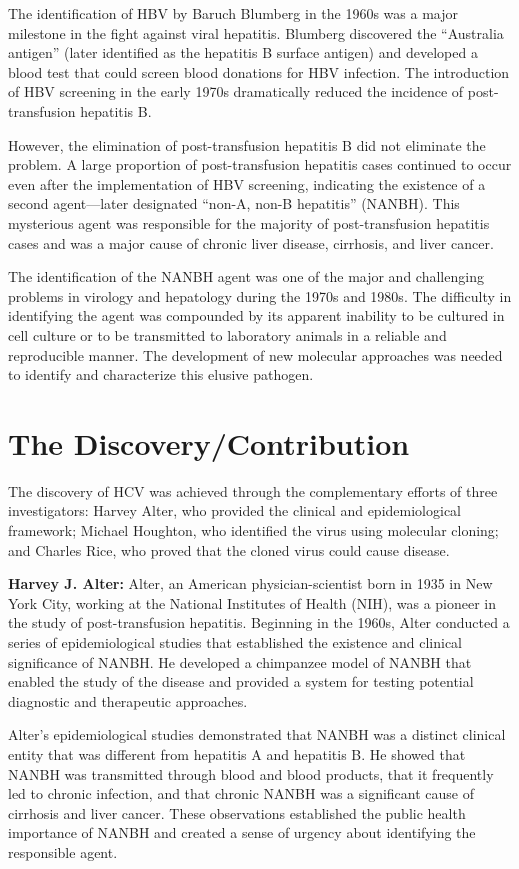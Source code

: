 The identification of HBV by Baruch Blumberg in the 1960s was a major milestone in the fight against viral hepatitis. Blumberg discovered the ``Australia antigen'' (later identified as the hepatitis B surface antigen) and developed a blood test that could screen blood donations for HBV infection. The introduction of HBV screening in the early 1970s dramatically reduced the incidence of post-transfusion hepatitis B.

However, the elimination of post-transfusion hepatitis B did not eliminate the problem. A large proportion of post-transfusion hepatitis cases continued to occur even after the implementation of HBV screening, indicating the existence of a second agent---later designated ``non-A, non-B hepatitis'' (NANBH). This mysterious agent was responsible for the majority of post-transfusion hepatitis cases and was a major cause of chronic liver disease, cirrhosis, and liver cancer.

The identification of the NANBH agent was one of the major and challenging problems in virology and hepatology during the 1970s and 1980s. The difficulty in identifying the agent was compounded by its apparent inability to be cultured in cell culture or to be transmitted to laboratory animals in a reliable and reproducible manner. The development of new molecular approaches was needed to identify and characterize this elusive pathogen.

\section{The Discovery/Contribution}

The discovery of HCV was achieved through the complementary efforts of three investigators: Harvey Alter, who provided the clinical and epidemiological framework; Michael Houghton, who identified the virus using molecular cloning; and Charles Rice, who proved that the cloned virus could cause disease.

\textbf{Harvey J. Alter:} Alter, an American physician-scientist born in 1935 in New York City, working at the National Institutes of Health (NIH), was a pioneer in the study of post-transfusion hepatitis. Beginning in the 1960s, Alter conducted a series of epidemiological studies that established the existence and clinical significance of NANBH. He developed a chimpanzee model of NANBH that enabled the study of the disease and provided a system for testing potential diagnostic and therapeutic approaches.

Alter's epidemiological studies demonstrated that NANBH was a distinct clinical entity that was different from hepatitis A and hepatitis B. He showed that NANBH was transmitted through blood and blood products, that it frequently led to chronic infection, and that chronic NANBH was a significant cause of cirrhosis and liver cancer. These observations established the public health importance of NANBH and created a sense of urgency about identifying the responsible agent.

